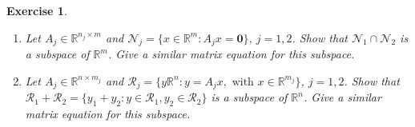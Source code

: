 \documentclass[12pt]{article}
\theoremstyle{colon}
\newtheorem{exercise}{Exercise}
\begin{document}
\clearpage

\begin{exercise}
  \ 

  \begin{enumerate}[label=\alph*)]
    \item Let $A_j \in \mathbb{R}^{n_j \times m}$ and $\mathcal{N}_j = \{ x \in \mathbb{R}^m: A_j x = \bm{0} \}$, $j = 1, 2$. Show that $\mathcal{N}_1 \cap \mathcal{N}_2$ is a subspace of $\mathbb{R}^m$. Give a similar matrix equation for this subspace.

    \item Let $A_j \in \mathbb{R}^{n \times m_j}$ and $\mathcal{R}_j = \{ y \mathbb{R}^n: y = A_j x, \text{ with } x \in \mathbb{R}^{m_j} \}$, $j = 1, 2$. Show that $\mathcal{R}_1 + \mathcal{R}_2 = \{y_1 + y_2: y \in \mathcal{R}_1, y_2 \in \mathcal{R}_2 \}$ is a subspace of $\mathbb{R}^n$. Give a similar matrix equation for this subspace.
  \end{enumerate}
\end{exercise}
\end{document}
